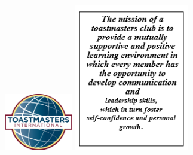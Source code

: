\documentclass{article}
\begin{document}
  \begin{figure}[b]
    \includegraphics[width=3cm]{logo}
    \includegraphics[width=5cm]{mission}
  \end{figure}
\end{document}
